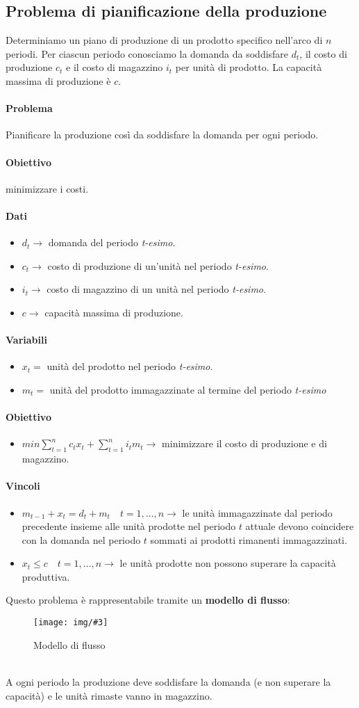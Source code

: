 \documentclass[12pt, twoside, letterpaper]{article}
\newcommand{\img}[3] {
	\begin{figure}[h]
		\caption{#1}
		\centering
		\texttt{[image: img/\#3]}\\
	\end{figure}
}
\newcommand{\problemai}[5]{
	#1
	\begin{dati}
		\paragraph{Dati} 
			\begin{itemize}
				#2
			\end{itemize}
	\end{dati}
	\begin{variabili}
		\paragraph{Variabili} 
			\begin{itemize}
				#3
			\end{itemize}
	\end{variabili}
	\begin{obiettivo}
		\paragraph{Obiettivo} 
			\begin{itemize}
				#4
			\end{itemize}
	\end{obiettivo}
	\begin{vincoli}
		\paragraph{Vincoli}
			\begin{itemize}
				#5
			\end{itemize}
	\end{vincoli}
}
\begin{document}
		\subsection{Problema di pianificazione della produzione}
			\problemai{
				Determiniamo un piano di produzione di un prodotto specifico nell'arco di $n$ periodi. Per ciascun periodo conosciamo la domanda da soddisfare $d_t$, il costo di produzione $c_t$ e il costo di magazzino $i_t$ per unità di prodotto. La capacità massima di produzione è $c$.
				
				\paragraph{Problema} Pianificare la produzione così da soddisfare la domanda per ogni periodo.
				
				\paragraph{Obiettivo} minimizzare i costi.
			}{
				\item $d_t \rightarrow$ domanda del periodo \textit{t-esimo}.
				\item $c_t \rightarrow$ costo di produzione di un'unità nel periodo \textit{t-esimo}.
				\item $i_t \rightarrow$ costo di magazzino di un unità nel periodo \textit{t-esimo}.
				\item $c \rightarrow$ capacità massima di produzione.
			}{
				\item $x_t =$ unità del prodotto nel periodo \textit{t-esimo}.
				\item $m_t =$ unità del prodotto immagazzinate al termine del periodo \textit{t-esimo}
			}{
				\item $min \sum _{t=1}^n c_t x_t + \sum_{t=1}^n i_t m_t \rightarrow$ minimizzare il costo di produzione e di magazzino.
			}{
				\item $m_{t-1} + x_t = d_t + m_t \quad t = 1, \dots, n \rightarrow$ le unità immagazzinate dal periodo precedente insieme alle unità prodotte nel periodo $t$ attuale devono coincidere con la domanda nel periodo $t$ sommati ai prodotti rimanenti immagazzinati.
				\item $x_t \leq c \quad t = 1, \dots, n \rightarrow$ le unità prodotte non possono superare la capacità produttiva.
			}
			Questo problema è rappresentabile tramite un \textbf{modello di flusso}:
			\img{Modello di flusso}{0.7}{img1.png}
			\\A ogni periodo la produzione deve soddisfare la domanda (e non superare la capacità) e le unità rimaste vanno in magazzino.	
			
\end{document}
